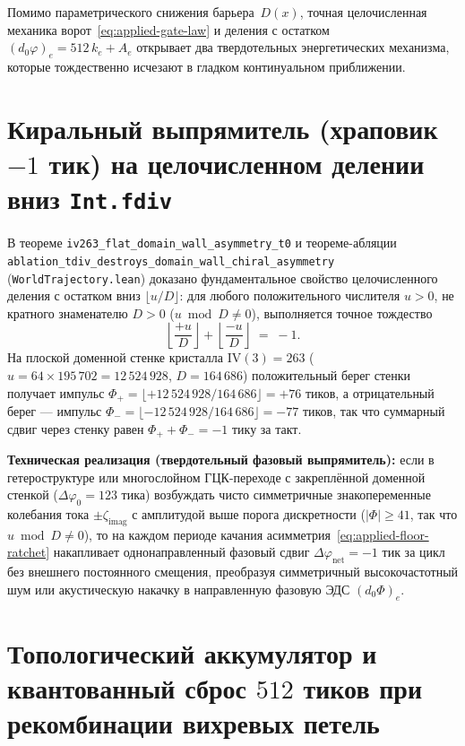 Помимо параметрического снижения барьера~$D(x)$, точная целочисленная механика ворот~\eqref{eq:applied-gate-law} и деления с остатком $(d_0\varphi)_e = 512\,k_e + A_e$ открывает два твердотельных энергетических механизма, которые тождественно исчезают в гладком континуальном приближении.

\section{Киральный выпрямитель (храповик $-1$ тик) на целочисленном делении вниз \texttt{Int.fdiv}}
\label{sec:applied-chiral-ratchet}

В теореме \texttt{iv263\_flat\_domain\_wall\_asymmetry\_t0} и теореме-абляции \texttt{ablation\_\allowbreak tdiv\_\allowbreak destroys\_\allowbreak domain\_\allowbreak wall\_\allowbreak chiral\_\allowbreak asymmetry} (\texttt{WorldTrajectory.lean}) доказано фундаментальное свойство целочисленного деления с остатком вниз $\lfloor u / D\rfloor$:
для любого положительного числителя $u > 0$, не кратного знаменателю $D > 0$ ($u \bmod D \ne 0$), выполняется точное тождество
\begin{equation}
\label{eq:applied-floor-ratchet}
  \left\lfloor \frac{+u}{D} \right\rfloor + \left\lfloor \frac{-u}{D} \right\rfloor \;=\; -1.
\end{equation}
На плоской доменной стенке кристалла $\mathrm{IV}(3)=263$ ($u = 64\times 195\,702 = 12\,524\,928$, $D = 164\,686$) положительный берег стенки получает импульс $\Phi_+ = \lfloor +12\,524\,928 / 164\,686\rfloor = +76$ тиков, а отрицательный берег --- импульс $\Phi_- = \lfloor -12\,524\,928 / 164\,686\rfloor = -77$ тиков, так что суммарный сдвиг через стенку равен $\Phi_+ + \Phi_- = -1$ тику за такт.

\textbf{Техническая реализация (твердотельный фазовый выпрямитель):}
если в гетероструктуре или многослойном ГЦК-переходе с закреплённой доменной стенкой ($\Delta\varphi_0 = 123$ тика) возбуждать чисто симметричные знакопеременные колебания тока $\pm\zeta_{\mathrm{imag}}$ с амплитудой выше порога дискретности ($|\Phi| \ge 41$, так что $u \bmod D \ne 0$), то на каждом периоде качания асимметрия~\eqref{eq:applied-floor-ratchet} накапливает однонаправленный фазовый сдвиг $\Delta\varphi_{\mathrm{net}} = -1$ тик за цикл без внешнего постоянного смещения, преобразуя симметричный высокочастотный шум или акустическую накачку в направленную фазовую ЭДС $(d_0\Phi)_e$.

\section{Топологический аккумулятор и квантованный сброс \texorpdfstring{$512$}{512} тиков при рекомбинации вихревых петель}
\label{sec:applied-topological-battery}

